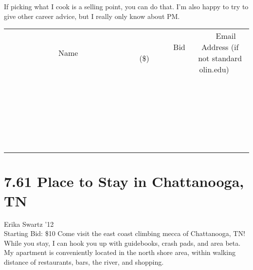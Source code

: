 \documentclass[11pt]{article}
\begin{document}
If picking what I cook is a selling point, you can do that. I'm also happy to try to give other career advice, but I really only know about PM.
\\[6ex]
\begin{tabular}{c c c}
~~~~~~~~~~~~~Name~~~~~~~~~~~~~ & ~~~~~~~~~Bid (\$)~~~~~~~~~  & ~~~Email Address (if not standard olin.edu)~~~\\
 & & \\
\hline
 & & \\
\hline
 & & \\
\hline
 & & \\
\hline
 & & \\
\hline
 & & \\
\hline
 & & \\
\hline
 & & \\
\hline
 & & \\
\hline
 & & \\
\hline
 & & \\
\hline
 & & \\
\hline
 & & \\
\hline
 & & \\
\hline
 & & \\
\hline
 & & \\
\hline
 & & \\
\hline
 & & \\
\hline
 & & \\
\hline
 & & \\
\hline
 & & \\
\hline
 & & \\
\hline
 & & \\
\hline
 & & \\
\hline
 & & \\
\hline
 & & \\
\hline
\end{tabular}
\newpage
\section*{7.61 Place to Stay in Chattanooga, TN}
Erika Swartz '12
\\
Starting Bid: \$10
\newline
Come visit the east coast climbing mecca of Chattanooga, TN! While you stay, I can hook you up with guidebooks, crash pads, and area beta. My apartment is conveniently located in the north shore area, within walking distance of restaurants, bars, the river, and shopping. 
\end{document}
